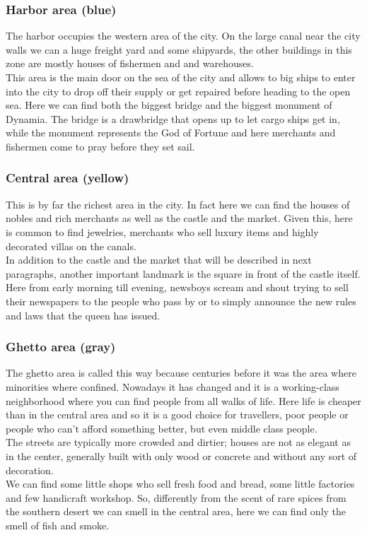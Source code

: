 \subsubsection{Harbor area (blue)}
The harbor occupies the western area of the city. On the large canal near the city walls we can a huge freight yard and some shipyards, the  other buildings in this zone are mostly houses of fishermen and and warehouses.\\
This area is the main door on the sea of the city and allows to big ships to enter into the city to drop off their supply or get repaired before heading to the open sea. Here we can find both the biggest bridge and the biggest monument of Dynamia. The bridge is a drawbridge that opens up to let cargo ships get in, while the monument represents the God of Fortune and here merchants and fishermen come to pray before they set sail.\\

\subsubsection{Central area (yellow)}
This is by far the richest area in the city. In fact here we can find the houses of  nobles and rich merchants as well as the castle and the market. Given this, here is common to find jewelries, merchants who sell luxury items and highly decorated villas on the canals. \\
In addition to the castle and the market that will be described in next paragraphs, another important landmark is the square in front of the castle itself. Here from early morning till evening, newsboys scream and shout trying to sell their newspapers to the people who pass by  or to simply announce the new rules and laws that the queen has issued.

\subsubsection{Ghetto area (gray)}
The ghetto area is called this way because centuries before it was the area where  minorities where confined. Nowadays it has changed and it is a working-class neighborhood where you can find people from all walks of life. Here life is cheaper than in the central area and so it is a good choice for travellers, poor people or people who can't afford something better, but even middle class people.\\
The streets are typically more crowded and dirtier; houses are not as elegant as in the center, generally built with only wood or concrete and without any sort of decoration. \\
We can find some little shops who sell fresh food and bread, some little factories and few handicraft workshop. So, differently from the scent of rare spices from the southern desert we can smell in the central area, here we can find only the smell of fish and smoke.

